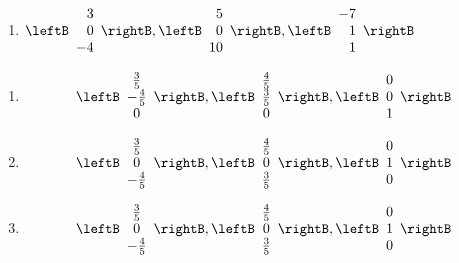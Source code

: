 \begin{enumialphparenastyle}
\begin{ex}
\begin{enumerate}
\item $\leftB
\begin{array}{r}
 3 \\
0 \\
-4
\end{array}
\rightB ,\leftB
\begin{array}{r}
 5 \\
0 \\
10
\end{array}
\rightB ,\leftB
\begin{array}{r}
-7 \\
1 \\
1
\end{array}
\rightB $
\end{enumerate}
\begin{sol}
\begin{enumerate}
\item
\[
\leftB
\begin{array}{c}
\frac{3}{5} \\
-\frac{4}{5} \\
0
\end{array}
\rightB ,\leftB
\begin{array}{c}
\frac{4}{5} \\
\frac{3}{5} \\
0
\end{array}
\rightB ,\leftB
\begin{array}{c}
0 \\
0 \\
1
\end{array}
\rightB
\]
\item
\[
\leftB
\begin{array}{c}
\frac{3}{5} \\
0 \\
-\frac{4}{5}
\end{array}
\rightB ,\leftB
\begin{array}{c}
\frac{4}{5} \\
0 \\
\frac{3}{5}
\end{array}
\rightB ,\leftB
\begin{array}{c}
0 \\
1 \\
0
\end{array}
\rightB
\]
\item
\[
\leftB
\begin{array}{c}
\frac{3}{5} \\
0 \\
-\frac{4}{5}
\end{array}
\rightB ,\leftB
\begin{array}{c}
\frac{4}{5} \\
0 \\
\frac{3}{5}
\end{array}
\rightB ,\leftB
\begin{array}{c}
0 \\
1 \\
0
\end{array}
\rightB
\]
\end{enumerate}
\end{sol}
\end{ex}


\end{enumialphparenastyle}
